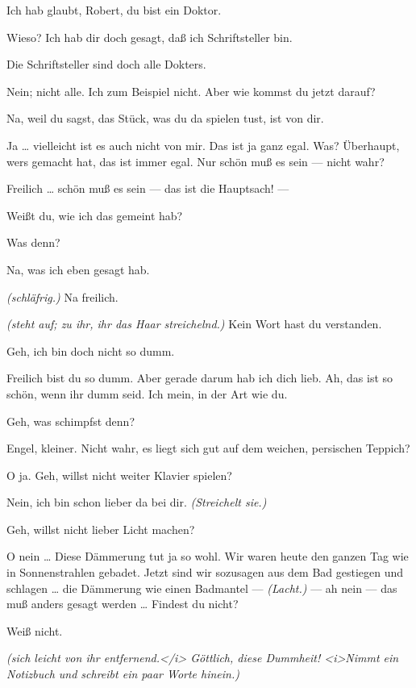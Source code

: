 \documentclass[
	final,
	a4paper,
	ngerman,
	mpinclude = true, %
	twoside = true,
	open = right,
	cleardoublepage = plain,
	DIV = 13,
	BCOR = 1cm,
	titlepage = firstiscover,
	]{scrbook}
\newcommand{\direction}[1]{\textit{(#1)}}
\newcommand{\thecharacter}[1]{\textup{\textsc{#1}}\xspace}
\newcommand{\thesuesse}{\thecharacter{Süßes Mädel}}
\newcommand{\thedichter}{\thecharacter{Dichter}}
\newcommand{\character}[1]{\item[#1:]}
\newcommand{\suesse}{\character{\thesuesse}}
\newcommand{\dichter}{\character{\thedichter}}
\begin{document}
\begin{play}
	\suesse
	Ich hab glaubt, Robert, du bist ein Doktor.

	\dichter
	Wieso? Ich hab dir doch gesagt, daß ich Schriftsteller bin.

	\suesse
	Die Schriftsteller sind doch alle Dokters.

	\dichter
	Nein; nicht alle. Ich zum Beispiel nicht. Aber wie kommst du jetzt darauf?

	\suesse
	Na, weil du sagst, das Stück, was du da spielen tust, ist von dir.

	\dichter
	Ja \ldots{} vielleicht ist es auch nicht von mir. Das ist ja ganz egal. Was? Überhaupt, wers gemacht hat, das ist immer egal. Nur schön muß es sein --- nicht wahr?

	\suesse
	Freilich \ldots{} schön muß es sein --- das ist die Hauptsach! ---

	\dichter
	Weißt du, wie ich das gemeint hab?

	\suesse
	Was denn?

	\dichter
	Na, was ich eben gesagt hab.

	\suesse
	\direction{schläfrig.} Na freilich.

	\dichter
	\direction{steht auf; zu ihr, ihr das Haar streichelnd.} Kein Wort hast du verstanden.

	\suesse
	Geh, ich bin doch nicht so dumm.

	\dichter
	Freilich bist du so dumm. Aber gerade darum hab ich dich lieb. Ah, das ist so schön, wenn ihr dumm seid. Ich mein, in der Art wie du.

	\suesse
	Geh, was schimpfst denn?

	\dichter
	Engel, kleiner. Nicht wahr, es liegt sich gut auf dem weichen, persischen Teppich?

	\suesse
	O ja. Geh, willst nicht weiter Klavier spielen?

	\dichter
	Nein, ich bin schon lieber da bei dir. \direction{Streichelt sie.}

	\suesse
	Geh, willst nicht lieber Licht machen?

	\dichter
	O nein \ldots{} Diese Dämmerung tut ja so wohl. Wir waren heute den ganzen Tag wie in Sonnenstrahlen gebadet. Jetzt sind wir sozusagen aus dem Bad gestiegen und schlagen \ldots{} die Dämmerung wie einen Badmantel --- \direction{Lacht.} --- ah nein --- das muß anders gesagt werden \ldots{} Findest du nicht?

	\suesse
	Weiß nicht.

	\dichter
	\direction{sich leicht von ihr entfernend.</i> Göttlich, diese Dummheit! <i>Nimmt ein Notizbuch und schreibt ein paar Worte hinein.}


\end{play}
\end{document}

